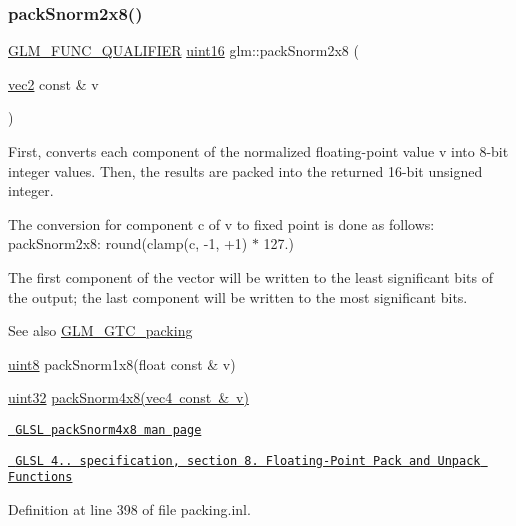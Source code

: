 \subsubsection{\texorpdfstring{packSnorm2x8()}{packSnorm2x8()}}
{\footnotesize\ttfamily \mbox{\hyperlink{setup_8hpp_a33fdea6f91c5f834105f7415e2a64407}{G\+L\+M\+\_\+\+F\+U\+N\+C\+\_\+\+Q\+U\+A\+L\+I\+F\+I\+ER}} \mbox{\hyperlink{group__gtc__type__precision_gad8c2939e1fdd8e5828b31d95c52255d5}{uint16}} glm\+::pack\+Snorm2x8 (\begin{DoxyParamCaption}\item[{\mbox{\hyperlink{group__core__types_gaa1618f51db67eaa145db101d8c8431d8}{vec2}} const \&}]{v }\end{DoxyParamCaption})}

First, converts each component of the normalized floating-\/point value v into 8-\/bit integer values. Then, the results are packed into the returned 16-\/bit unsigned integer.

The conversion for component c of v to fixed point is done as follows\+: pack\+Snorm2x8\+: round(clamp(c, -\/1, +1) $\ast$ 127.)

The first component of the vector will be written to the least significant bits of the output; the last component will be written to the most significant bits.

\begin{DoxySeeAlso}{See also}
\mbox{\hyperlink{group__gtc__packing}{G\+L\+M\+\_\+\+G\+T\+C\+\_\+packing}} 

\mbox{\hyperlink{group__gtc__type__precision_ga1a7dcd8aac97cc8020817c94049deff2}{uint8}} pack\+Snorm1x8(float const \& v) 

\mbox{\hyperlink{group__gtc__type__precision_ga202b6a53c105fcb7e531f9b443518451}{uint32}} \mbox{\hyperlink{group__core__func__packing_gafcf25acc0d361c6c696a433aa5dfd16b}{pack\+Snorm4x8(vec4 const \& v)}} 

\href{http://www.opengl.org/sdk/docs/manglsl/xhtml/packSnorm4x8.xml}{\texttt{ G\+L\+SL pack\+Snorm4x8 man page}} 

\href{http://www.opengl.org/registry/doc/GLSLangSpec.4.20.8.pdf}{\texttt{ G\+L\+SL 4.. specification, section 8. Floating-\/\+Point Pack and Unpack Functions}} 
\end{DoxySeeAlso}


Definition at line 398 of file packing.\+inl.

\mbox{\label{group__gtc__packing_ga0d4157cec37c0312216a7be1cc92df54}} 
